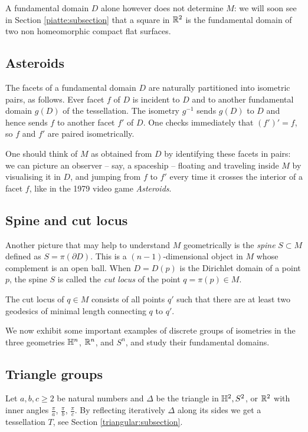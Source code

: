 A fundamental domain $D$ alone however does not determine $M$: we will soon see in Section \ref{piatte:subsection} that a square in $\mathbb{R}^2$ is the fundamental domain of two non homeomorphic compact flat surfaces.

\subsection{Asteroids}
The facets of a fundamental domain $D$ are naturally partitioned into isometric pairs, as follows. Ever facet $f$ of $D$ is incident to $D$ and to another fundamental domain $g(D)$ of the tessellation. The isometry $g^{-1}$ sends $g(D)$ to $D$ and hence sends $f$ to another facet $f'$ of $D$. One checks immediately that $(f')' = f$, so $f$ and $f'$ are paired isometrically. 

One should think of $M$ as obtained from $D$ by identifying these facets in pairs: we can picture an observer -- say, a spaceship -- floating and traveling inside $M$ by visualising it in $D$, and jumping from $f$ to $f'$ every time it crosses the interior of a facet $f$, like in the 1979 video game \emph{Asteroids}.

\subsection{Spine and cut locus}
Another picture that may help to understand $M$ geometrically is the \emph{spine} $S \subset M$ defined as $S=\pi(\partial D)$. This is a $(n-1)$-dimensional object in $M$ whose complement is an open ball. When $D = D(p)$ is the Dirichlet domain of a point $p$, the spine $S$ is called the \emph{cut locus} of the point $q=\pi(p) \in M$. 

\begin{ex}
The cut locus of $q \in M$ consists of all points $q'$ such that there are at least two geodesics of minimal length connecting $q$ to $q'$.
\end{ex}

We now exhibit some important examples of discrete groups of isometries in the three geometries $\mathbb{H}^n$, $\mathbb{R}^n$, and $S^n$, and study their fundamental domains. 

\subsection{Triangle groups} \label{triangle:groups:subsection}
Let $a,b,c \geqslant 2$ be natural numbers and $\Delta$ be the triangle in $\mathbb{H}^2, S^2$, or $\mathbb{R}^2$ with inner angles $\frac \pi a$, $\frac \pi b$, $\frac \pi c$. By reflecting iteratively $\Delta$ along its sides we get a tessellation $T$, see Section \ref{triangular:subsection}. 

